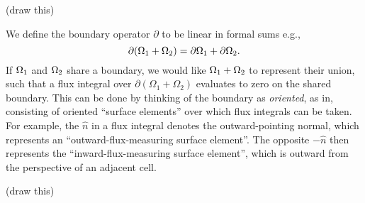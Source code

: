 \vskip 0.2in
(draw this)
\vskip 0.2in

We define the boundary operator $\partial$ to be linear in formal sums e.g.,
    $$\partial(\Omega_1 + \Omega_2) = {\partial\Omega}_1 + {\partial\Omega}_2.$$
If ${\Omega}_1$ and ${\Omega}_2$ share a boundary, we would like ${\Omega}_1 + {\Omega}_2$ to represent their union, such that a flux
integral over $\partial(\Omega_1 + \Omega_2)$ evaluates to zero on the shared boundary. This can be done by thinking of
the boundary as \textit{oriented}, as in, consisting of oriented ``surface elements'' over which flux integrals can be taken.
For example, the $\hat{n}$ in a flux integral denotes the outward-pointing normal, which represents an ``outward-flux-measuring surface element''.
The opposite $-\hat{n}$ then represents the ``inward-flux-measuring surface element'', which is outward from the perspective of an adjacent cell.

\vskip 0.2in
(draw this)
\vskip 0.2in


